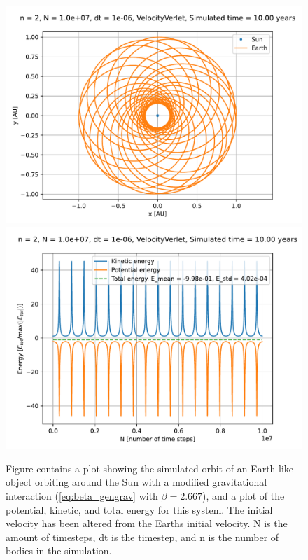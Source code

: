 \documentclass[reprint,english,notitlepage]{revtex4-1}  %
\begin{document}
\begin{figure}[H]
\includegraphics[width=\columnwidth]{../data/figures/varyingbeta/se_peturbed_beta2667_vv_orbits2D.pdf}
\includegraphics[width=\columnwidth]{../data/figures/varyingbeta/se_peturbed_beta2667_vv_energy.pdf}
\caption{Figure contains a plot showing the simulated orbit of an Earth-like object orbiting around the Sun with a modified gravitational interaction (\eqref{eq:beta_gengrav} with $\beta = 2.667$), and a plot of the potential, kinetic, and total energy for this system. The initial velocity has been altered from the Earths initial velocity. N is the amount of timesteps, dt is the timestep, and n is the number of bodies in the simulation.}
\label{fig:beta2667_peturbed}
\end{figure}
\end{document}
